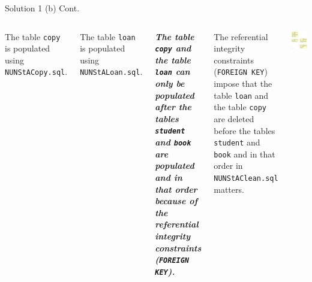 \begin{frame}[fragile]{Solution 1 (b) Cont.}

\begin{columns}
The table \texttt{copy} is populated using \texttt{NUNStACopy.sql}. \vspace{10pt}

The table \texttt{loan} is populated using \texttt{NUNStALoan.sql}. \vspace{10pt}

\textit{\textbf{The table \texttt{copy} and the table \texttt{loan} can only be populated after the tables \texttt{student} and \texttt{book} are populated and in that order because of the referential integrity constraints (\texttt{FOREIGN KEY}).} } \vspace{10pt}

The referential integrity constraints (\texttt{FOREIGN KEY}) impose that the table \texttt{loan} and the table \texttt{copy} are deleted before the tables \texttt{student} and \texttt{book} and in that order in \texttt{NUNStAClean.sql} matters.

\includegraphics[width=\textwidth]{t1/images/t1-0.png}
\end{columns}

\end{frame}

